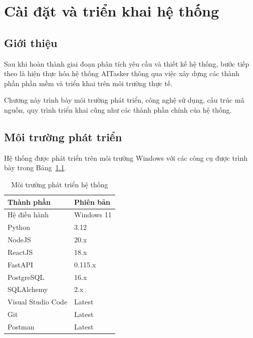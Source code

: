 \chapter{Cài đặt và triển khai hệ thống}

\section{Giới thiệu}

Sau khi hoàn thành giai đoạn phân tích yêu cầu và thiết kế hệ thống, bước tiếp
theo là hiện thực hóa hệ thống AITasker thông qua việc xây dựng các thành phần
phần mềm và triển khai trên môi trường thực tế.

Chương này trình bày môi trường phát triển, công nghệ sử dụng, cấu trúc mã
nguồn, quy trình triển khai cũng như các thành phần chính của hệ thống.


\section{Môi trường phát triển}

Hệ thống được phát triển trên môi trường Windows với các công cụ được trình bày
trong Bảng~\ref{tab:development_environment}.

\begin{table}[H]
\centering
\caption{Môi trường phát triển hệ thống}
\label{tab:development_environment}

\begin{tabular}{|p{6cm}|p{8cm}|}
\hline
\textbf{Thành phần} & \textbf{Phiên bản} \\ \hline

Hệ điều hành & Windows 11 \\ \hline

Python & 3.12 \\ \hline

NodeJS & 20.x \\ \hline

ReactJS & 18.x \\ \hline

FastAPI & 0.115.x \\ \hline

PostgreSQL & 16.x \\ \hline

SQLAlchemy & 2.x \\ \hline

Visual Studio Code & Latest \\ \hline

Git & Latest \\ \hline

Postman & Latest \\ \hline

\end{tabular}

\end{table}

